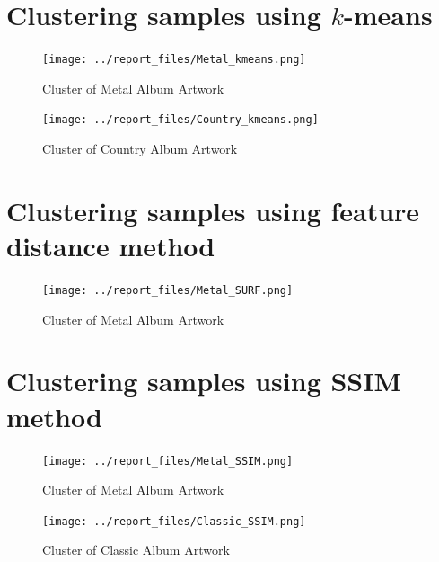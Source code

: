 \documentclass{article}
\begin{document}



\newpage

\appendix

\section{Clustering samples using $k$-means}

\begin{figure}[h!]
\centering
\texttt{[image: ../report\_files/Metal\_kmeans.png]}
\caption{Cluster of Metal Album Artwork}
\label{mk}
\end{figure}
\begin{figure}[h!]
\centering
\texttt{[image: ../report\_files/Country\_kmeans.png]}
\caption{Cluster of Country Album Artwork}
\label{ck}
\end{figure}

\section{Clustering samples using feature distance method}

\begin{figure}[h!]
\centering
\texttt{[image: ../report\_files/Metal\_SURF.png]}
\caption{Cluster of Metal Album Artwork}
\label{msu}
\end{figure}

\section{Clustering samples using SSIM method}

\begin{figure}[h!]
\centering
\texttt{[image: ../report\_files/Metal\_SSIM.png]}
\caption{Cluster of Metal Album Artwork}
\label{ms}
\end{figure}
\begin{figure}[h!]
\centering
\texttt{[image: ../report\_files/Classic\_SSIM.png]}
\caption{Cluster of Classic Album Artwork}
\label{cs}
\end{figure}
\end{document}
